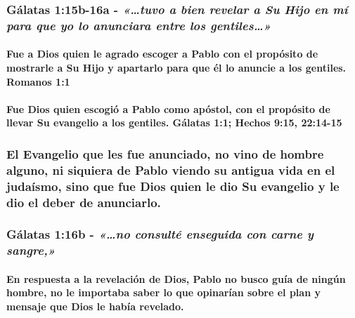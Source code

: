 \documentclass[11a pt,twoside]{article}
\newcommand{\scripture}[1]{%
  {\fontsize{12pt}{16pt}\selectfont\ScriptureFont\itshape #1}%
}
\let\oldsubsubsection\subsubsection
\renewcommand{\subsubsection}{\needspace{4\baselineskip}\oldsubsubsection}
\let\oldparagraph\paragraph
\renewcommand{\paragraph}{\needspace{3\baselineskip}\oldparagraph}
\begin{document}
\subsubsection{\texorpdfstring{Gálatas 1:15b-16a -
\scripture{«…tuvo a bien revelar a Su Hijo en mí para que yo lo anunciara entre los gentiles…»}}{Gálatas 1:15b-16a - }}\label{guxe1latas-115b-16a---tuvo-a-bien-revelar-a-su-hijo-en-muxed-para-que-yo-lo-anunciara-entre-los-gentiles}

\paragraph{Fue a Dios quien le agrado escoger a Pablo con el propósito
de mostrarle a Su Hijo y apartarlo para que él lo anuncie a los
gentiles. Romanos
1:1}\label{fue-a-dios-quien-le-agrado-escoger-a-pablo-con-el-propuxf3sito-de-mostrarle-a-su-hijo-y-apartarlo-para-que-uxe9l-lo-anuncie-a-los-gentiles.-romanos-11}

\paragraph{Fue Dios quien escogió a Pablo como apóstol, con el propósito
de llevar Su evangelio a los gentiles. Gálatas 1:1; Hechos 9:15,
22:14-15}\label{fue-dios-quien-escogiuxf3-a-pablo-como-apuxf3stol-con-el-propuxf3sito-de-llevar-su-evangelio-a-los-gentiles.-guxe1latas-11-hechos-915-2214-15}

\subsubsection{El Evangelio que les fue anunciado, no vino de hombre
alguno, ni siquiera de Pablo viendo su antigua vida en el judaísmo, sino
que fue Dios quien le dio Su evangelio y le dio el deber de
anunciarlo.}\label{el-evangelio-que-les-fue-anunciado-no-vino-de-hombre-alguno-ni-siquiera-de-pablo-viendo-su-antigua-vida-en-el-judauxedsmo-sino-que-fue-dios-quien-le-dio-su-evangelio-y-le-dio-el-deber-de-anunciarlo.}

\subsubsection{\texorpdfstring{Gálatas 1:16b -
\scripture{«…no consulté enseguida con carne y sangre,»}}{Gálatas 1:16b - }}\label{guxe1latas-116b---no-consultuxe9-enseguida-con-carne-y-sangre}

\paragraph{En respuesta a la revelación de Dios, Pablo no busco guía de
ningún hombre, no le importaba saber lo que opinarían sobre el plan y
mensaje que Dios le había
revelado.}\label{en-respuesta-a-la-revelaciuxf3n-de-dios-pablo-no-busco-guuxeda-de-ninguxfan-hombre-no-le-importaba-saber-lo-que-opinaruxedan-sobre-el-plan-y-mensaje-que-dios-le-habuxeda-revelado.}
\end{document}
